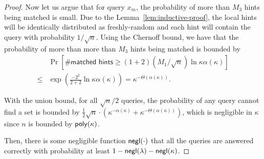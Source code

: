 \begin{proof}
    Now let us argue that for query $x_m$, the probability of more than $M_3$ hints being matched is small. 
    Due to the Lemma~\ref{lem:inductive-proof}, the local hints will be identically distributed as freshly-random and each hint will contain the query with probability $1/\sqrt{n}$. 
    Using the Chernoff bound, we have that the probability of more than more than $M_3$ hints being matched is bounded by
    \begin{align*}
     & \Pr[\#\textsf{matched hints} \ge (1+2) (M_1/\sqrt{n})\ln \kappa \alpha(\kappa) ] \\ 
     \le & \exp \left(\frac{-2^2}{2+2}\ln
     \kappa\alpha(\kappa)\right) = \kappa^{-\Theta(\alpha(\kappa))}.
    \end{align*}   
    
     With the union bound, for all $\sqrt{n}/2$ queries, the probability of any query cannot find a set is bounded by $\frac{1}{2}\sqrt{n}\cdot 
    (\kappa^{-\alpha(\kappa)} + \kappa^{-\Theta(\alpha(\kappa))})$, which is negligible in $\kappa$ since $n$ is bounded by $\mathsf{poly}(\kappa)$.
    
    
    Then, there is some negligible function $\mathsf{negl}(\cdot)$ that all the queries are answered correctly with probability at least $1-\mathsf{negl}(\lambda)-\mathsf{negl}(\kappa)$.
    
\end{proof}